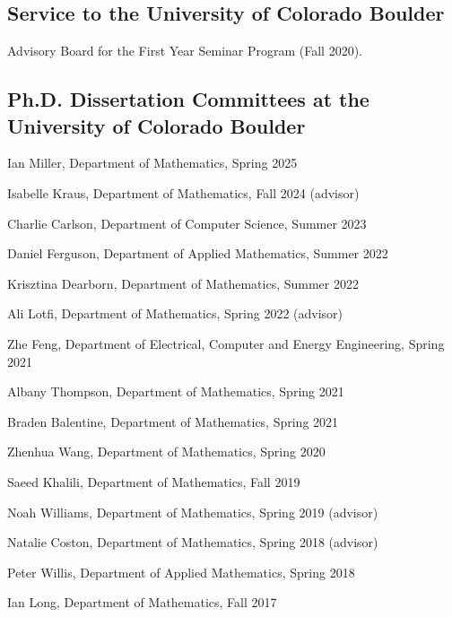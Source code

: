 \documentclass[letterpaper]{article}
\renewenvironment{itemize}{
  \begin{list}{}{
    \setlength{\leftmargin}{1em}
  }
}{
  \end{list}
}
\begin{document}
\subsection*{Service to the University of Colorado Boulder} 
\begin{itemize}
	\item Advisory Board for the First Year Seminar Program (Fall 2020). 
\end{itemize}

\subsection*{Ph.D. Dissertation Committees at the University of Colorado Boulder} 
\begin{itemize}
	\item Ian Miller, Department of Mathematics, Spring 2025
	\item Isabelle Kraus, Department of Mathematics, Fall 2024 (advisor)
	\item Charlie Carlson, Department of Computer Science, Summer 2023
	\item Daniel Ferguson, Department of Applied Mathematics, Summer 2022
	\item Krisztina Dearborn, Department of Mathematics, Summer 2022
	\item Ali Lotfi, Department of Mathematics, Spring 2022 (advisor)
	\item Zhe Feng, Department of Electrical, Computer and Energy Engineering, Spring 2021
	\item Albany Thompson, Department of Mathematics, Spring 2021
	\item Braden Balentine, Department of Mathematics, Spring 2021
	\item Zhenhua Wang, Department of Mathematics, Spring 2020 
	\item Saeed Khalili, Department of Mathematics, Fall 2019 
	\item Noah Williams, Department of Mathematics, Spring 2019 (advisor)
	\item Natalie Coston, Department of Mathematics, Spring 2018 (advisor) 
	\item Peter Willis, Department of Applied Mathematics, Spring 2018 
	\item Ian Long, Department of Mathematics, Fall 2017
\end{itemize}
\end{document}
